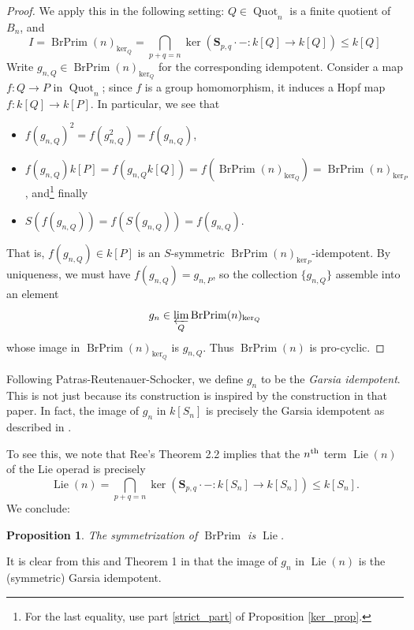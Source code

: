 \documentclass[12pt]{article}
\DeclareMathOperator{\Quot}{Quot}
\DeclareMathOperator{\Lie}{Lie}
\DeclareMathOperator{\BrPrim}{BrPrim}
\newcommand{\bS} {\mathbf{S}}
\newcommand{\nth}{\textsuperscript{th}}
\theoremstyle{plain}
\newtheorem{prop}[thm]{Proposition}
\theoremstyle{definition}
\theoremstyle{remark}
\begin{document}
\begin{proof}
We apply this in the following setting: $Q \in \Quot_n$ is a finite quotient of $B_n$, and 
%
$$I = \BrPrim(n)_{\ker_Q} = \bigcap_{p+q=n} \ker(\bS_{p,q} \cdot -: k[Q] \to k[Q]) \leq k[Q]$$
%
Write $g_{n, Q} \in \BrPrim(n)_{\ker_Q}$ for the corresponding idempotent.  Consider a map $f: Q \to P$ in $\Quot_n$; since $f$ is a group homomorphism, it induces a Hopf map $f: k[Q] \to k[P]$.  In particular, we see that
%
\begin{itemize}
\item $f(g_{n, Q})^2 = f(g_{n, Q}^2) = f(g_{n, Q})$,
\item $f(g_{n, Q}) k[P] = f(g_{n, Q} k[Q]) = f(\BrPrim(n)_{\ker_Q}) = \BrPrim(n)_{\ker_P}$, and\footnote{For the last equality, use part \ref{strict_part} of Proposition \ref{ker_prop}.} finally 
\item $S(f(g_{n, Q})) = f(S(g_{n, Q})) = f(g_{n, Q})$.
\end{itemize}
%
That is, $f(g_{n, Q}) \in k[P]$ is an $S$-symmetric $\BrPrim(n)_{\ker_P}$-idempotent.  By uniqueness, we must have $f(g_{n, Q}) = g_{n, P}$, so the collection $\{g_{n, Q}\}$ assemble into an element 
%
$$g_n \in \varprojlim_Q \BrPrim(n)_{\ker_Q}$$
%
whose image in $\BrPrim(n)_{\ker_Q}$ is $g_{n, Q}$.  Thus $\BrPrim(n)$ is pro-cyclic.

\end{proof}

Following Patras-Reutenauer-Schocker, we define $g_n$ to be the \emph{Garsia idempotent}.  This is not just because its construction is inspired by the construction in that paper.  In fact, the image of $g_n$ in $k[S_n]$ is precisely the Garsia idempotent as described in \cite{prs}.  

To see this, we note that Ree's Theorem 2.2 \cite{ree} implies that the $n\nth$ term $\Lie(n)$ of the Lie operad is precisely
%
$$\Lie(n) = \bigcap_{p+q=n} \ker(\bS_{p,q} \cdot -: k[S_n] \to k[S_n]) \leq k[S_n].$$
%
We conclude:

\begin{prop}

The symmetrization of $\BrPrim$ is $\Lie$.

\end{prop}

It is clear from this and Theorem 1 in \cite{prs} that the image of $g_n$ in $\Lie(n)$ is the (symmetric) Garsia idempotent.
\end{document}

